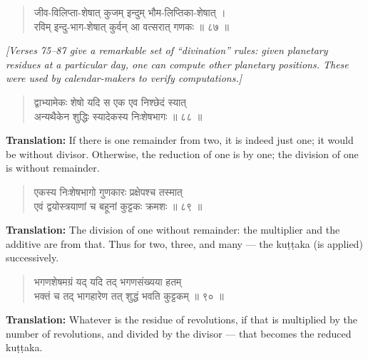 \documentclass[11pt,a4paper]{article}
\newcommand{\cnote}[1]{\textcolor{notecolor}{\textit{#1}}}
\newenvironment{shloka}{\begin{verse}\devanagarifont\large}{\end{verse}}
\begin{document}
\vspace{0.3cm}

\begin{shloka}
जीव-विलिप्ता-शेषात् कुजम् इन्दुम् भौम-लिप्तिका-शेषात् ।\\
रविम् इन्दु-भाग-शेषात् कुर्वन् आ वत्सरात् गणकः ॥ ८७ ॥
\end{shloka}

\vspace{0.5cm}
\cnote{[Verses 75–87 give a remarkable set of ``divination'' rules: given
planetary residues at a particular day, one can compute other
planetary positions. These were used by calendar-makers to verify
computations.]}

\vspace{0.3cm}

\begin{shloka}
द्वाभ्यामेकः शेषो यदि स एक एव निश्छेदं स्यात् \\
अन्यथैकेन शुद्धिः स्यादेकस्य निःशेषभागः ॥ ८८ ॥
\end{shloka}

\textbf{Translation:}\quad
If there is one remainder from two, it is indeed just one; it would
be without divisor. Otherwise, the reduction of one is by one; the
division of one is without remainder.

\vspace{0.3cm}

\begin{shloka}
एकस्य निःशेषभागो गुणकारः प्रक्षेपश्च तस्मात् \\
एवं द्वयोस्त्रयाणां च बहूनां कुट्टकः क्रमशः ॥ ८९ ॥
\end{shloka}

\textbf{Translation:}\quad
The division of one without remainder: the multiplier and the
additive are from that. Thus for two, three, and many — the
kuṭṭaka (is applied) successively.

\vspace{0.3cm}

\begin{shloka}
भगणशेषमग्रं यद् यदि तद् भगणसंख्यया हतम् \\
भक्तं च तद् भागहारेण तत् शुद्धं भवति कुट्टकम् ॥ ९० ॥
\end{shloka}

\textbf{Translation:}\quad
Whatever is the residue of revolutions, if that is multiplied by
the number of revolutions, and divided by the divisor — that becomes
the reduced kuṭṭaka.

\vspace{0.3cm}
\end{document}
